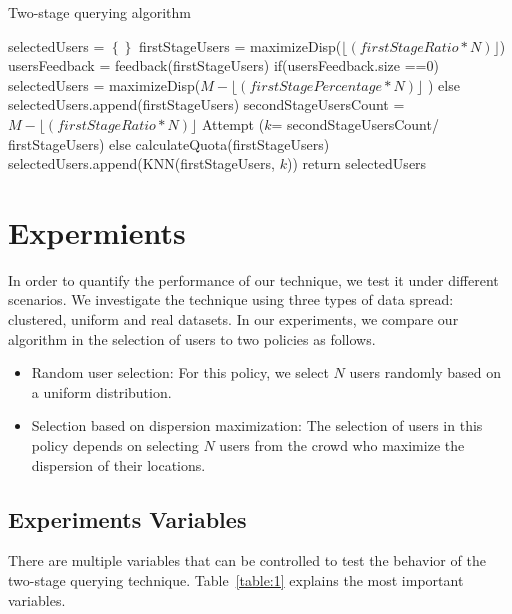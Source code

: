 \documentclass{acm_proc_article-sp}
\newcommand\floor[1]{\lfloor#1\rfloor}
\begin{document}
\begin{algorithm}
\caption{Two-stage querying algorithm}
\label{CHalgorithm}
\begin{algorithmic}[1]
\State selectedUsers = $\left\{\right\}$
\State firstStageUsers = maximizeDisp($\floor{(firstStageRatio*N)}$)
\State usersFeedback = feedback(firstStageUsers)
\State if(usersFeedback.size ==0) 
\State 	selectedUsers = maximizeDisp($M -\floor{(firstStagePercentage*N)}$ ){}
\State else {
\State selectedUsers.append(firstStageUsers)
\State  secondStageUsersCount = $M -  \floor{(firstStageRatio*N)}$
\State  Attempt ($k$= secondStageUsersCount/ firstStageUsers)
\State else 	calculateQuota(firstStageUsers)
\State selectedUsers.append(KNN(firstStageUsers, $k$))
\State return selectedUsers} 
\EndProcedure
\end{algorithmic}
\end{algorithm}



\cite{adults}
\section{Expermients}
In order to quantify the performance of our technique, we test it under different scenarios. We investigate the technique using three types of data spread: clustered, uniform and real datasets. In our experiments, we compare our algorithm in the selection of users to two policies as follows.
\begin{itemize}
\item Random user selection: For this policy, we select $N$ users randomly based on a uniform distribution.
\item Selection based on dispersion maximization: The selection of users in this policy depends on selecting $N$ users from the crowd who maximize the dispersion of their locations.
\end{itemize}
\subsection{Experiments Variables}
There are multiple variables that can be controlled to test the behavior of the two-stage querying technique. Table~\ref{table:1} explains the most important variables.
\end{document}
